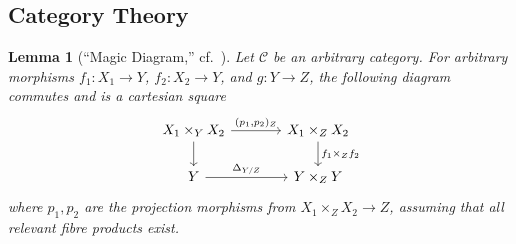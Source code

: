 \documentclass[10pt]{article}
\newtheorem{lemma}[subsubsection]{Lemma}
\theoremstyle{definition}
\theoremstyle{remark}
\numberwithin{equation}{section}
\numberwithin{figure}{subsubsection}
\begin{document}
\subsection{Category Theory}
\begin{lemma}[{``Magic Diagram,'' cf.\ \cite[1.3.S]{FOAG}}]\label{lem:magic}
  Let $\mathscr{C}$ be an arbitrary category.
  For arbitrary morphisms $f_1\colon X_1 \to Y$, $f_2\colon X_2 \to Y$, and
  $g\colon Y \to Z$, the following diagram
  commutes and is a cartesian square
  \begin{equation*}
    \begin{tikzcd}[column sep=large]
      X_1 \times_Y X_2 \rar{(p_1,p_2)_Z}\dar & X_1 \times_Z X_2\dar{f_1
      \times_Z f_2}\\
      Y \rar{\Delta_{Y/Z}} & Y \times_Z Y
    \end{tikzcd}
  \end{equation*}
  where $p_1,p_2$ are the projection morphisms from $X_1 \times_Z X_2 \to Z$,
  assuming that all relevant fibre products exist.
\end{lemma}
\end{document}
